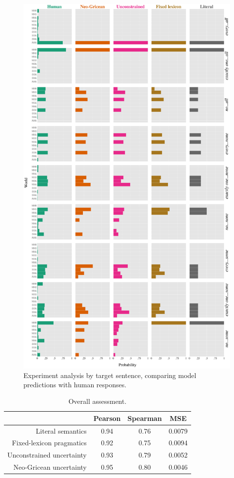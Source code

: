 \documentclass[leqno,12pt]{article}
\begin{document}
\begin{figure}[!h]
  \centering
  \includegraphics[height=0.9\textheight]{fig/allmodels}
  \caption{Experiment analysis by target sentence, 
    comparing model predictions with human responses.}
  \label{fig:exp-analysis}
\end{figure}

\begin{table}[th!]
  \centering
  \begin{tabular}[c]{r c c c}
    \toprule
    & Pearson & Spearman & MSE \\
    \midrule
    Literal semantics         & 0.94 & 0.76 & 0.0079\\
    Fixed-lexicon pragmatics  & 0.92 & 0.75 & 0.0094\\
    Unconstrained uncertainty & 0.93 & 0.79 & 0.0052\\
    Neo-Gricean uncertainty   & 0.95 & 0.80 & 0.0046\\
    \bottomrule   
  \end{tabular}
  \caption{Overall assessment.}
  \label{tab:overall}
\end{table}
\end{document}

